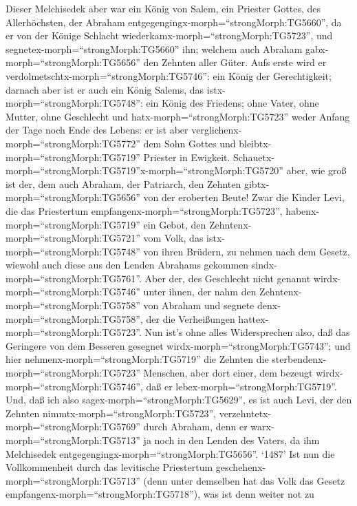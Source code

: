  Dieser Melchisedek aber war ein König von Salem, ein
Priester Gottes, des Allerhöchsten, der Abraham
entgegengingx-morph=``strongMorph:TG5660'', da er von der Könige
Schlacht wiederkamx-morph=``strongMorph:TG5723'', und
segnetex-morph=``strongMorph:TG5660'' ihn;  welchem auch
Abraham gabx-morph=``strongMorph:TG5656'' den Zehnten aller Güter. Aufs
erste wird er verdolmetschtx-morph=``strongMorph:TG5746'': ein König der
Gerechtigkeit; darnach aber ist er auch ein König Salems, das
istx-morph=``strongMorph:TG5748'': ein König des Friedens; 
ohne Vater, ohne Mutter, ohne Geschlecht und
hatx-morph=``strongMorph:TG5723'' weder Anfang der Tage noch Ende des
Lebens: er ist aber verglichenx-morph=``strongMorph:TG5772'' dem Sohn
Gottes und bleibtx-morph=``strongMorph:TG5719'' Priester in Ewigkeit.
Schauetx-morph=``strongMorph:TG5719''\textbar x-morph=``strongMorph:TG5720''
aber, wie groß ist der, dem auch Abraham, der Patriarch, den Zehnten
gibtx-morph=``strongMorph:TG5656'' von der eroberten Beute! 
Zwar die Kinder Levi, die das Priestertum
empfangenx-morph=``strongMorph:TG5723'',
habenx-morph=``strongMorph:TG5719'' ein Gebot, den
Zehntenx-morph=``strongMorph:TG5721'' vom Volk, das
istx-morph=``strongMorph:TG5748'' von ihren Brüdern, zu nehmen nach dem
Gesetz, wiewohl auch diese aus den Lenden Abrahams gekommen
sindx-morph=``strongMorph:TG5761''.  Aber der, des
Geschlecht nicht genannt wirdx-morph=``strongMorph:TG5746'' unter ihnen,
der nahm den Zehntenx-morph=``strongMorph:TG5758'' von Abraham und
segnete denx-morph=``strongMorph:TG5758'', der die Verheißungen
hattex-morph=``strongMorph:TG5723''.  Nun ist's ohne alles
Widersprechen also, daß das Geringere von dem Besseren gesegnet
wirdx-morph=``strongMorph:TG5743'';  und hier
nehmenx-morph=``strongMorph:TG5719'' die Zehnten die
sterbendenx-morph=``strongMorph:TG5723'' Menschen, aber dort einer, dem
bezeugt wirdx-morph=``strongMorph:TG5746'', daß er
lebex-morph=``strongMorph:TG5719''.  Und, daß ich also
sagex-morph=``strongMorph:TG5629'', es ist auch Levi, der den Zehnten
nimmtx-morph=``strongMorph:TG5723'',
verzehntetx-morph=``strongMorph:TG5769'' durch Abraham, 
denn er warx-morph=``strongMorph:TG5713'' ja noch in den Lenden des
Vaters, da ihm Melchisedek entgegengingx-morph=``strongMorph:TG5656''.
 `1487' Ist nun die Vollkommenheit durch das levitische
Priestertum geschehenx-morph=``strongMorph:TG5713'' (denn unter
demselben hat das Volk das Gesetz
empfangenx-morph=``strongMorph:TG5718''), was ist denn weiter not zu

